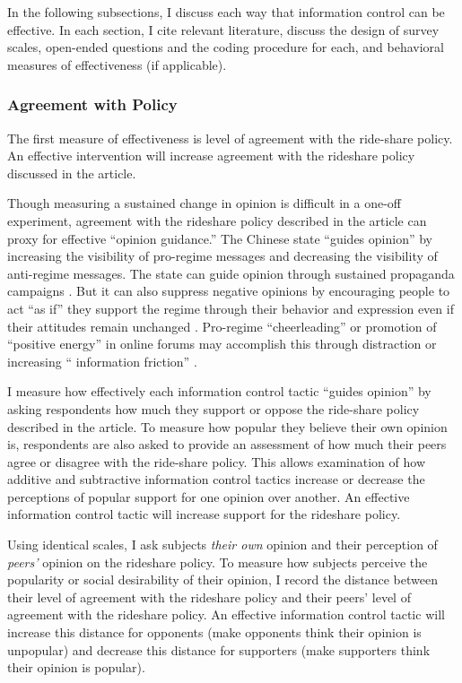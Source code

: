 \documentclass[11pt]{article}
\begin{document}
In the following subsections, I discuss each way that information control can be effective. In each section, I cite relevant literature, discuss the design of survey scales, open-ended questions and the coding procedure for each, and behavioral measures of effectiveness (if applicable).

\subsubsection{Agreement with Policy}

The first measure of effectiveness is level of agreement with the ride-share policy. An effective intervention will increase agreement with the rideshare policy discussed in the article.

Though measuring a sustained change in opinion is difficult in a one-off experiment, agreement with the rideshare policy described in the article can proxy for effective ``opinion guidance.'' The Chinese state ``guides opinion'' by increasing the visibility of pro-regime messages and decreasing the visibility of anti-regime messages. The state can guide opinion through sustained propaganda campaigns \citep{geddes1989sources}. But it can also suppress negative opinions by encouraging people to act ``as if'' they support the regime through their behavior and expression even if their attitudes remain unchanged \citep{wedeen1999ambiguities}. Pro-regime ``cheerleading'' or promotion of ``positive energy'' in online forums may accomplish this through distraction \citep{king2016chinese} or increasing `` information friction'' \citep{roberts2018censored}.

I measure how effectively each information control tactic ``guides opinion'' by asking respondents how much they support or oppose the ride-share policy described in the article. To measure how popular they believe their own opinion is, respondents are also asked to provide an assessment of how much their peers agree or disagree with the ride-share policy. This allows examination of how additive and subtractive information control tactics increase or decrease the perceptions of popular support for one opinion over another. An effective information control tactic will increase support for the rideshare policy.

Using identical scales, I ask subjects {\it their own} opinion and their perception of {\it peers'} opinion on the rideshare policy. To measure how subjects perceive the popularity or social desirability of their opinion, I record the distance between their level of agreement with the rideshare policy and their peers' level of agreement with the rideshare policy. An effective information control tactic will increase this distance for opponents (make opponents think their opinion is unpopular) and decrease this distance for supporters (make supporters think their opinion is popular).
\end{document}
